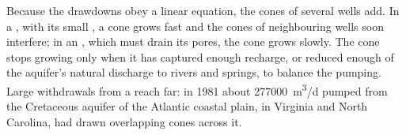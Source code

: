 Because the drawdowns obey a linear equation, the cones of several wells
add. In a , with its small , a cone grows fast
and the cones of neighbouring wells soon interfere; in an , which must drain its pores, the cone grows slowly. The cone stops
growing only when it has captured enough recharge, or reduced enough of
the aquifer's natural discharge to rivers and springs, to balance the
pumping. Large withdrawals from a  reach far: in 1981
about \qty{277000}{m^3/d} pumped from the Cretaceous aquifer of the
Atlantic coastal plain, in Virginia and North Carolina, had drawn
overlapping cones across it.


